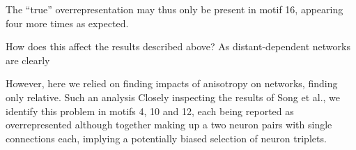 The \enquote{true} overrepresentation may thus only be present in
motif 16, appearing four more times as expected. 


 How does this affect the results described
above? As distant-dependent networks are clearly 

However, here we relied on finding impacts of anisotropy on networks,
finding only relative. Such an analysis Closely inspecting the results
of Song et al., we identify this problem in motifs 4, 10 and 12, each
being reported as overrepresented although together making up a two
neuron pairs with single connections each, implying a potentially
biased selection of neuron triplets.











